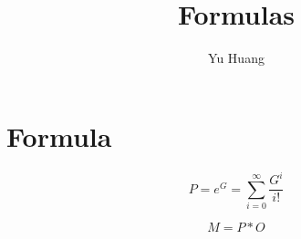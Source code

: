 \documentclass[a4paper,10pt]{article}
\title{Formulas}
\author{Yu Huang}
\begin{document}
\maketitle

\begin{abstract}

\end{abstract}

\section{Formula}
\begin{displaymath}
P = e^G = \sum_{i=0}^{\infty} \frac{G^i}{i!}
\end{displaymath}

\begin{displaymath}
M = P * O
\end{displaymath}
\end{document}
